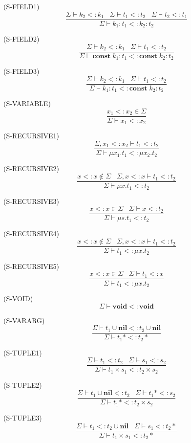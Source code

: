 \documentclass{paper}
\newcommand{\Nil}{\mathbf{nil}}
\newcommand{\Void}{\mathbf{void}}
\newcommand{\Const}{\mathbf{const}}
\newcommand{\mylabel}[1]{\; (\textsc{#1})}
\newcommand{\senv}{\Sigma}
\newcommand{\subtype}{<:}
\begin{document}
\mylabel{S-FIELD1}
\[
\dfrac{\senv \vdash k_{2} \subtype k_{1} \;\;\;
       \senv \vdash t_{1} \subtype t_{2} \;\;\;
       \senv \vdash t_{2} \subtype t_{1}}
      {\senv \vdash k_{1}:t_{1} \subtype k_{2}:t_{2}}
\]

\mylabel{S-FIELD2}
\[
\dfrac{\senv \vdash k_{2} \subtype k_{1} \;\;\;
       \senv \vdash t_{1} \subtype t_{2}}
      {\senv \vdash \Const \; k_{1}:t_{1} \subtype \Const \; k_{2}:t_{2}}
\]

\mylabel{S-FIELD3}
\[
\dfrac{\senv \vdash k_{2} \subtype k_{1} \;\;\;
       \senv \vdash t_{1} \subtype t_{2}}
      {\senv \vdash k_{1}:t_{1} \subtype \Const \; k_{2}:t_{2}}
\]

\mylabel{S-VARIABLE}
\[
\dfrac{x_{1} \subtype x_{2} \in \senv}
      {\senv \vdash x_{1} \subtype x_{2}}
\]

\mylabel{S-RECURSIVE1}
\[
\dfrac{\senv, x_{1} \subtype x_{2} \vdash t_{1} \subtype t_{2}}
      {\senv \vdash \mu x_{1}.t_{1} \subtype \mu x_{2}.t_{2}}
\]

\mylabel{S-RECURSIVE2}
\[
\dfrac{x \subtype x \not\in \senv \;\;\;
      \senv, x \subtype x \vdash t_{1} \subtype t_{2}}
      {\senv \vdash \mu x.t_{1} \subtype t_{2}}
\]

\mylabel{S-RECURSIVE3}
\[
\dfrac{x \subtype x \in \senv \;\;\;
       \senv \vdash x \subtype t_{2}}
      {\senv \vdash \mu s.t_{1} \subtype t_{2}}
\]

\mylabel{S-RECURSIVE4}
\[
\dfrac{x \subtype x \not\in \senv \;\;\;
       \senv, x \subtype x \vdash t_{1} \subtype t_{2}}
      {\senv \vdash t_{1} \subtype \mu x.t_{2}}
\]

\mylabel{S-RECURSIVE5}
\[
\dfrac{x \subtype x \in \senv \;\;\;
       \senv \vdash t_{1} \subtype x}
      {\senv \vdash t_{1} \subtype \mu x.t_{2}}
\]

\mylabel{S-VOID}
\[
\senv \vdash \Void \subtype \Void
\]

\mylabel{S-VARARG}
\[
\dfrac{\senv \vdash t_{1} \cup \Nil \subtype t_{2} \cup \Nil}
      {\senv \vdash t_{1}* \subtype t_{2}*}
\]

\mylabel{S-TUPLE1}
\[
\dfrac{\senv \vdash t_{1} \subtype t_{2} \;\;\;
       \senv \vdash s_{1} \subtype s_{2}}
      {\senv \vdash t_{1} \times s_{1} \subtype t_{2} \times s_{2}}
\]

\mylabel{S-TUPLE2}
\[
\dfrac{\senv \vdash t_{1} \cup \Nil \subtype t_{2} \;\;\;
       \senv \vdash t_{1}* \subtype s_{2}}
      {\senv \vdash t_{1}* \subtype t_{2} \times s_{2}}
\]

\mylabel{S-TUPLE3}
\[
\dfrac{\senv \vdash t_{1} \subtype t_{2} \cup \Nil \;\;\;
       \senv \vdash s_{1} \subtype t_{2}*}
      {\senv \vdash t_{1} \times s_{1} \subtype t_{2}*}
\]
\end{document}
